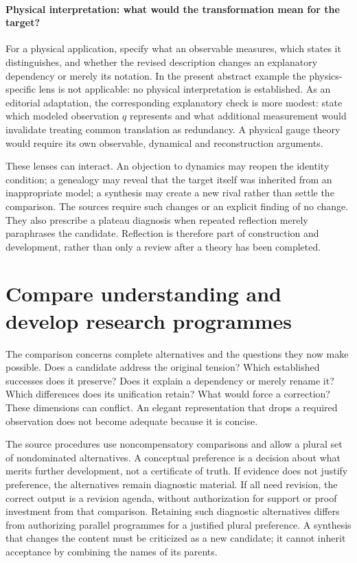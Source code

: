 \paragraph{Physical interpretation: what would the transformation mean for the target?}
For a physical application, specify what an observable measures, which states it
distinguishes, and whether the revised description changes an explanatory
dependency or merely its notation. In the present abstract example the physics-specific lens is not applicable:
no physical interpretation is established. As an editorial adaptation, the
corresponding explanatory check is more modest: state
which modeled observation $q$ represents and what additional measurement would
invalidate treating common translation as redundancy. A physical gauge theory
would require its own observable, dynamical and reconstruction arguments.

These lenses can interact. An objection to dynamics may reopen the identity
condition; a genealogy may reveal that the target itself was inherited from an
inappropriate model; a synthesis may create a new rival rather than settle the
comparison. The sources require such changes or an explicit finding of no change.
They also prescribe a plateau diagnosis when repeated reflection merely
paraphrases the candidate. Reflection is therefore part of construction and
development, rather than only a review after a theory has been completed.

\section{Compare understanding and develop research programmes}
\label{sec:conceptual-programmes}
The comparison concerns complete alternatives and the questions they now make
possible. Does a candidate address the original tension? Which established
successes does it preserve? Does it explain a dependency or merely rename it?
Which differences does its unification retain? What would force a correction?
These dimensions can conflict. An elegant representation that drops a required
observation does not become adequate because it is concise.

The source procedures use noncompensatory comparisons and allow a plural set of
nondominated alternatives. A conceptual preference is a decision about what merits
further development, not a certificate of truth. If evidence does not justify
preference, the alternatives remain diagnostic material. If all need revision,
the correct output is a revision agenda, without authorization for support or proof
investment from that comparison. Retaining such diagnostic alternatives differs
from authorizing parallel programmes for a justified plural preference. A synthesis that changes the content
must be criticized as a new candidate; it cannot inherit acceptance by combining
the names of its parents.

